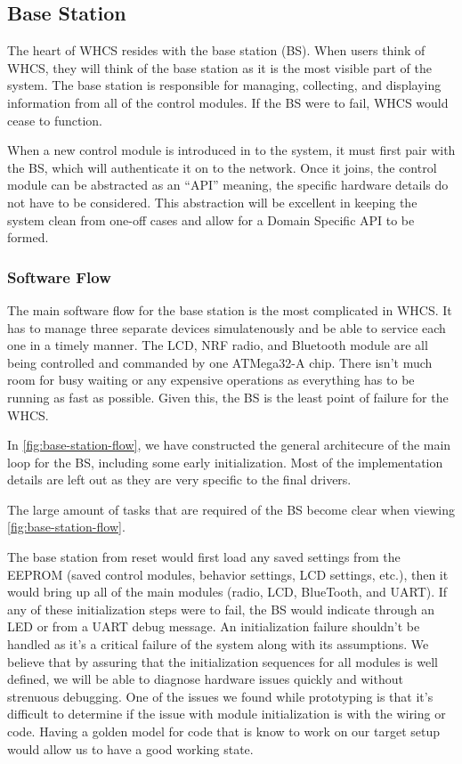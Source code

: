 
\subsection{Base Station}
The heart of WHCS resides with the base station (BS). When users think of WHCS, they
will think of the base station as it is the most visible part of the system.
The base station is responsible for managing, collecting, and displaying
information from all of the control modules. If the BS were to fail, WHCS
would cease to function.

When a new control module is introduced in to the system, it must first pair
with the BS, which will authenticate it on to the network. Once it joins, the
control module can be abstracted as an ``API'' meaning, the specific hardware
details do not have to be considered. This abstraction will be excellent in
keeping the system clean from one-off cases and allow for a Domain Specific API
to be formed.

\subsubsection{Software Flow}
The main software flow for the base station is the most complicated in WHCS. It
has to manage three separate devices simulatenously and be able to service each
one in a timely manner. The LCD, NRF radio, and Bluetooth module are all being
controlled and commanded by one ATMega32-A chip. There isn't much room for busy
waiting or any expensive operations as everything has to be running as fast as
possible. Given this, the BS is the least point of failure for the WHCS.

In \autoref{fig:base-station-flow}, we have constructed the general architecure
of the main loop for the BS, including some early initialization. Most of the
implementation details are left out as they are very specific to the final
drivers.


The large amount of tasks that are required of the BS become clear when viewing
\autoref{fig:base-station-flow}.

The base station from reset would first load any saved settings from the
EEPROM (saved control modules, behavior settings, LCD settings, etc.), then it
would bring up all of the main modules (radio, LCD, BlueTooth, and UART). If
any of these initialization steps were to fail, the BS would indicate through
an LED or from a UART debug message. An initialization failure shouldn't be
handled as it's a critical failure of the system along with its assumptions. We
believe that by assuring that the initialization sequences for all modules is
well defined, we will be able to diagnose hardware issues quickly and without
strenuous debugging. One of the issues we found while prototyping is that it's
difficult to determine if the issue with module initialization is with the
wiring or code. Having a golden model for code that is know to work on our
target setup would allow us to have a good working state.

